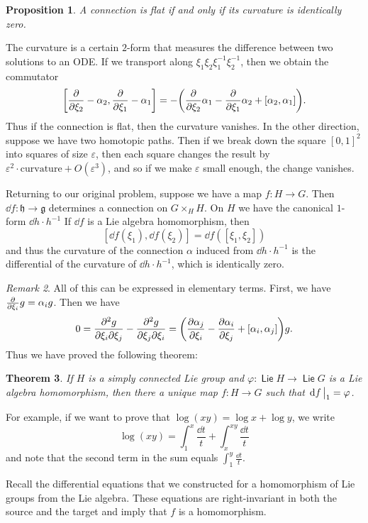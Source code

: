 \documentclass[leqno, openany]{memoir}
\newtheorem{thm}{Theorem}[section]
\newtheorem{prop}[thm]{Proposition}
\theoremstyle{definition}
\theoremstyle{remark}
\newtheorem{rmk}[thm]{Remark}
\theoremstyle{plain}
\theoremstyle{definition}
\theoremstyle{remark}
\newcommand{\ep}{\varepsilon}
\newcommand{\mf}[1]{\mathfrak{#1}}
\DeclareMathOperator{\Lie}{\mathsf{Lie}}
\begin{document}
\begin{prop}
    A connection is flat if and only if its curvature is identically zero.
\end{prop}

The curvature is a certain $2$-form that measures the difference between two solutions to an ODE. If we transport along $\xi_1 \xi_2 \xi_1^{-1} \xi_2^{-1}$, then we obtain the commutator
\[ \qty[ \pdv{\xi_2} - \alpha_2, \pdv{\xi_1} - \alpha_1 ] = - \qty( \pdv{\xi_2} \alpha_1 - \pdv{\xi_1} \alpha_2 + [\alpha_2, \alpha_1] ). \]
Thus if the connection is flat, then the curvature vanishes. In the other direction, suppose we have two homotopic paths. Then if we break down the square $[0,1]^2$ into squares of size $\ep$, then each square changes the result by $\ep^2 \cdot \text{curvature} + O(\ep^3)$, and so if we make $\ep$ small enough, the change vanishes.

Returning to our original problem, suppose we have a map $f \colon H \to G$. Then $\dd{f} \colon \mf{h} \to \mf{g}$ determines a connection on $G \times_H H$. On $H$ we have the canonical $1$-form $\dd{h} \cdot h^{-1}$ If $\dd{f}$ is a Lie algebra homomorphism, then 
\[ [\dd{f}(\xi_1), \dd{f}(\xi_2)] = \dd{f} ( [\xi_1, \xi_2] ) \]
and thus the curvature of the connection $\alpha$ induced from $\dd{h} \cdot h^{-1}$ is the differential of the curvature of $\dd{h} \cdot h^{-1}$, which is identically zero.

\begin{rmk}
    All of this can be expressed in elementary terms. First, we have $\pdv{\xi_i} g = \alpha_i g$. Then we have
    \[ 0 = \pdv{g}{\xi_i}{\xi_j} - \pdv{g}{\xi_j}{\xi_i} = \qty( \pdv{\alpha_j}{\xi_i} - \pdv{\alpha_i}{\xi_j} + [\alpha_i, \alpha_j] ) g. \]
    Thus we have proved the following theorem:
\end{rmk}

\begin{thm}
    If $H$ is a simply connected Lie group and $\varphi \colon \Lie H \to \Lie G$ is a Lie algebra homomorphism, then there a unique map $f \colon H \to G$ such that $\eval{\dd{f}}_1 = \varphi$.
\end{thm}

For example, if we want to prove that $\log(xy) = \log x + \log y$, we write
\[ \log(xy) = \int_1^x \frac{\dd{t}}{t} + \int_x^{xy} \frac{\dd{t}}{t} \]
and note that the second term in the sum equals $\int_1^y \frac{\dd{t}}{t}$.

Recall the differential equations that we constructed for a homomorphism of Lie groups from the Lie algebra. These equations are right-invariant in both the source and the target and imply that $f$ is a homomorphism.
\end{document}
